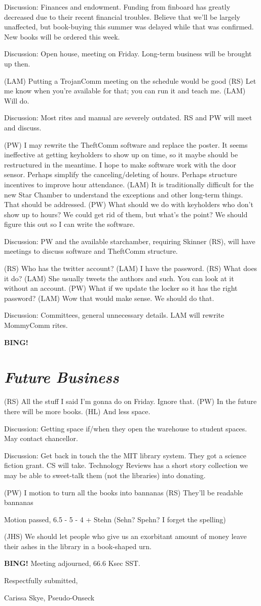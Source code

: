 \documentclass[10pt]{article}
\newcommand{\bing}{{\bf BING!} }
\newcommand{\goto}[1]{\bing \vskip 12pt \section*{{\em{#1}}}}
\newcommand{\onseck}{Carissa Skye, Pseudo-Onseck}
\begin{document}
Discussion: Finances and endowment. Funding from finboard has greatly decreased due to their recent financial troubles. Believe that 
	    we'll be largely unaffected, but book-buying this summer was delayed while that was confirmed. New books will be ordered this week.

Discussion: Open house, meeting on Friday. Long-term business will be brought up then.

(LAM) Putting a TrojanComm meeting on the schedule would be good
(RS) Let me know when you're available for that; you can run it and teach me.
(LAM) Will do.

Discussion: Most rites and manual are severely outdated. RS and PW will meet and discuss. 

(PW) I may rewrite the TheftComm software and replace the poster. It seems ineffective at getting keyholders to show up on time, so it maybe
     should be restructured in the meantime. I hope to make software work with the door sensor. Perhaps simplify the canceling/deleting of 
     hours. Perhaps structure incentives to improve hour attendance.
(LAM) It is traditionally difficult for the new Star Chamber to understand the exceptions and other long-term things. That should be addressed.
(PW) What should we do with keyholders who don't show up to hours? We could get rid of them, but what's the point? We should figure this out
     so I can write the software.

Discussion: PW and the available starchamber, requiring Skinner (RS), will have meetings to discuss software and TheftComm structure.

(RS) Who has the twitter account?
(LAM) I have the password.
(RS) What does it do?
(LAM) She usually tweets the authors and such. You can look at it without an account.
(PW) What if we update the locker so it has the right password?
(LAM) Wow that would make sense. We should do that.

Discussion: Committees, general unnecessary details. LAM will rewrite MommyComm rites.

\goto{Future Business}
(RS) All the stuff I said I'm gonna do on Friday. Ignore that.
(PW) In the future there will be more books.
(HL) And less space.

Discussion: Getting space if/when they open the warehouse to student spaces. May contact chancellor.

Discussion: Get back in touch the the MIT library system. They got a science fiction grant. CS will take. Technology Reviews has a short
	    story collection we may be able to sweet-talk them (not the libraries) into donating.

(PW) I motion to turn all the books into bannanas
(RS) They'll be readable bannanas

Motion passed, 6.5 - 5 - 4 + Stehn (Sehn? Spehn? I forget the spelling)

(JHS) We should let people who give us an exorbitant amount of money leave their ashes in the library in a book-shaped urn.

\bing
\noindent
Meeting adjourned, 66.6 Ksec SST.

\vspace{18pt}

\centerline{Respectfully submitted,}
\centerline{\onseck}
\end{document}
